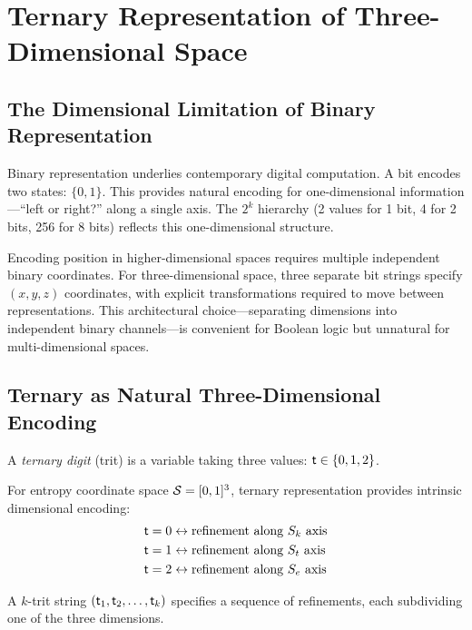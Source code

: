\section{Ternary Representation of Three-Dimensional Space}
\label{sec:ternary}

\subsection{The Dimensional Limitation of Binary Representation}

Binary representation underlies contemporary digital computation. A bit encodes two states: $\{0, 1\}$. This provides natural encoding for one-dimensional information—``left or right?'' along a single axis. The $2^k$ hierarchy (2 values for 1 bit, 4 for 2 bits, 256 for 8 bits) reflects this one-dimensional structure.

Encoding position in higher-dimensional spaces requires multiple independent binary coordinates. For three-dimensional space, three separate bit strings specify $(x, y, z)$ coordinates, with explicit transformations required to move between representations. This architectural choice—separating dimensions into independent binary channels—is convenient for Boolean logic but unnatural for multi-dimensional spaces.

\subsection{Ternary as Natural Three-Dimensional Encoding}

\begin{definition}
\label{def:trit}
A \textit{ternary digit} (trit) is a variable taking three values: $\mathsf{t} \in \{0, 1, 2\}$.
\end{definition}

For entropy coordinate space $\mathcal{S} = [0,1]^3$, ternary representation provides intrinsic dimensional encoding:
\begin{align}
\mathsf{t} = 0 &\leftrightarrow \text{refinement along } S_k \text{ axis} \\
\mathsf{t} = 1 &\leftrightarrow \text{refinement along } S_t \text{ axis} \\
\mathsf{t} = 2 &\leftrightarrow \text{refinement along } S_e \text{ axis}
\end{align}

A $k$-trit string $(\mathsf{t}_1, \mathsf{t}_2, \ldots, \mathsf{t}_k)$ specifies a sequence of refinements, each subdividing one of the three dimensions.

